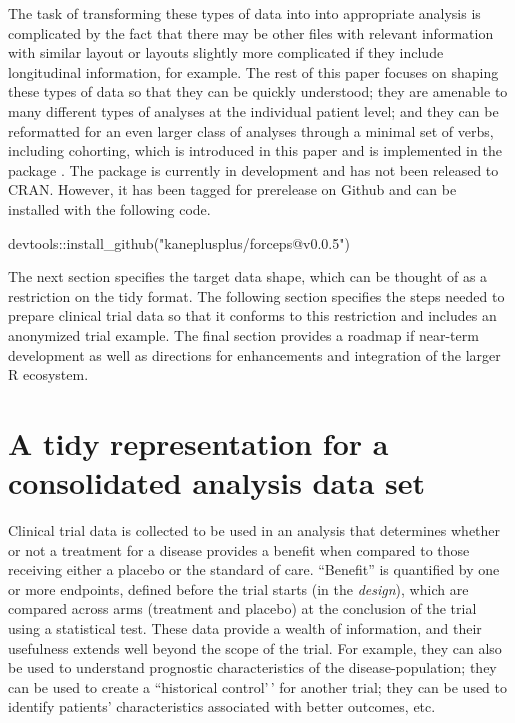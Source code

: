 The task of transforming these types of data into into appropriate
analysis is complicated by the fact that there may be other files with
relevant information with similar layout or layouts slightly more
complicated if they include longitudinal information, for example. The
rest of this paper focuses on shaping these types of data so that they
can be quickly understood; they are amenable to many different types of
analyses at the individual patient level; and they can be reformatted
for an even larger class of analyses through a minimal set of verbs,
including cohorting, which is introduced in this paper and is
implemented in the  package \citep{forceps}. The package is
currently in development and has not been released to CRAN. However, it
has been tagged for prerelease on Github and can be installed with the
following code.

\begin{Schunk}
\begin{Sinput}
devtools::install_github("kaneplusplus/forceps@v0.0.5")
\end{Sinput}
\end{Schunk}

\noindent The next section specifies the target data shape, which can be
thought of as a restriction on the tidy format. The following section
specifies the steps needed to prepare clinical trial data so that it
conforms to this restriction and includes an anonymized trial example.
The final section provides a roadmap if near-term development as well as
directions for enhancements and integration of the larger R ecosystem.

\hypertarget{a-tidy-representation-for-a-consolidated-analysis-data-set}{%
\section{A tidy representation for a consolidated analysis data
set}\label{a-tidy-representation-for-a-consolidated-analysis-data-set}}

Clinical trial data is collected to be used in an analysis that
determines whether or not a treatment for a disease provides a benefit
when compared to those receiving either a placebo or the standard of
care. ``Benefit'' is quantified by one or more endpoints, defined before
the trial starts (in the \emph{design}), which are compared across arms
(treatment and placebo) at the conclusion of the trial using a
statistical test. These data provide a wealth of information, and their
usefulness extends well beyond the scope of the trial. For example, they
can also be used to understand prognostic characteristics of the
disease-population; they can be used to create a ``historical
control'\,' for another trial; they can be used to identify patients'
characteristics associated with better outcomes, etc.

